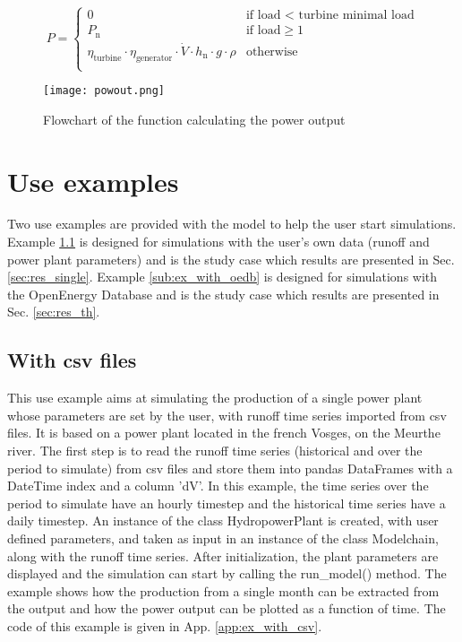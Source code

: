 \begin{equation}
  \label{eq_pow}
P= \left\{
    \begin{array}{ll}
	0 & \mbox{if load < turbine minimal load}\\
        P_\mathrm{n} & \mbox{if load}\geq 1 \\
        \eta_\mathrm{turbine} \cdot \eta_\mathrm{generator} \cdot \dot{V} \cdot h_\mathrm{n} \cdot g \cdot \rho & \mbox{otherwise}\\
    \end{array}
\right.
\end{equation}

\begin{figure}[H]
\centering
\texttt{[image: powout.png]}
\caption{Flowchart of the function calculating the power output}
\label{powout}
\end{figure}



\section{Use examples}
Two use examples are provided with the model to help the user start simulations. Example \ref{sub:ex_with_csv} is designed for simulations with the user's own data (runoff and power plant parameters) and is the study case which results are presented in Sec. \ref{sec:res_single}. Example \ref{sub:ex_with_oedb} is designed for simulations with the OpenEnergy Database and is the study case which results are presented in Sec. \ref{sec:res_th}.

\subsection{With csv files}
\label{sub:ex_with_csv}

This use example aims at simulating the production of a single power plant whose parameters are set by the user, with runoff time series imported from csv files. It is based on a power plant located in the french Vosges, on the Meurthe river. \newline
The first step is to read the runoff time series (historical and over the period to simulate) from csv files and store them into pandas DataFrames with a DateTime index and a column 'dV'.
In this example, the time series over the period to simulate have an hourly timestep and the historical time series have a daily timestep. An instance of the class HydropowerPlant is created, with user defined parameters, and taken as input in an instance of the class Modelchain, along with the runoff time series. \newline
After initialization, the plant parameters are displayed and the simulation can start by calling the run{\_}model() method. The example shows how the production from a single month can be extracted from the output and how the power output can be plotted as a function of time. The code of this example is given in App. \ref{app:ex_with_csv}.

